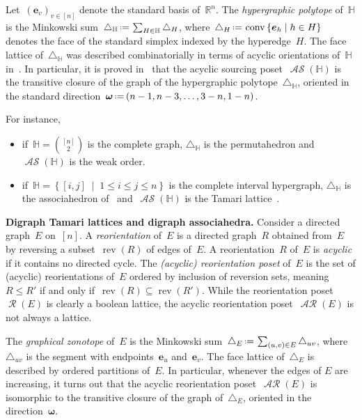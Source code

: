 \documentclass{amsart}
\theoremstyle{definition}
\newcommand{\R}{\mathbb{R}} %
\renewcommand{\b}[1]{\boldsymbol{#1}} %
\renewcommand{\c}[1]{\mathcal{#1}} %
\newcommand{\set}[2]{\left\{ #1 \;\middle|\; #2 \right\}} %
\newcommand{\eqdef}{\mbox{\,\raisebox{0.2ex}{\scriptsize\ensuremath{\mathrm:}}\ensuremath{=}\,}} %
\newcommand{\simplex}{\triangle} %
\DeclareMathOperator{\conv}{conv} %
\newcommand{\para}[1]{\bigskip\noindent\textbf{#1}} %
\newcommand{\darkblue}{\color{darkblue}} %
\newcommand{\defn}[1]{\textsl{\darkblue #1}} %
\DeclareMathOperator{\Reori}{\c{R}}  %
\DeclareMathOperator{\AReori}{\c{AR}}  %
\DeclareMathOperator{\rev}{rev} %
\DeclareMathOperator{\ASour}{\mathcal{AS}}  %
\newcommand{\HH}{\mathbb H}  %
\begin{document}
Let~$(\b{e}_v)_{v \in [n]}$ denote the standard basis of~$\R^n$.
The \defn{hypergraphic polytope} of~$\HH$ is the Minkowski sum~$\simplex_\HH \eqdef \sum_{H \in \HH} \simplex_H$, where~$\simplex_H \eqdef \conv\set{\b{e}_h}{h \in H}$ denotes the face of the standard simplex indexed by the hyperedge~$H$.
The face lattice of~$\simplex_\HH$ was described combinatorially in terms of acyclic orientations of~$\HH$ in~\cite{BenedettiBergeronMachacek}.
In particular, it is proved in~\cite{Gelinas} that the acyclic sourcing poset~$\ASour(\HH)$ is the transitive closure of the graph of the hypergraphic polytope~$\simplex_\HH$, oriented in the standard direction~$\b{\omega} \eqdef (n-1, n-3, \dots, 3-n, 1-n)$.

For instance, 
\begin{itemize}
\item if~$\HH = \binom{[n]}{2}$ is the complete graph, $\simplex_\HH$ is the permutahedron and $\ASour(\HH)$ is the weak order.
\item if~$\HH = \set{[i,j]}{1 \le i \le j \le n}$ is the complete interval hypergraph, $\simplex_\HH$ is the associahedron of~\cite{ShniderSternberg,Loday} and~$\ASour(\HH)$ is the Tamari lattice~\cite{Tamari}.
\end{itemize}


\para{Digraph Tamari lattices and digraph associahedra.}
Consider a directed graph~$E$ on~$[n]$.
A \defn{reorientation} of~$E$ is a directed graph~$R$ obtained from~$E$ by reversing a subset~$\rev(R)$ of edges of~$E$.
A reorientation~$R$ of~$E$ is \defn{acyclic} if it contains no directed cycle.
The \defn{(acyclic) reorientation poset} of~$E$ is the set of (acyclic) reorientations of~$E$ ordered by inclusion of reversion sets, meaning~$R \le R'$ if and only if~$\rev(R) \subseteq \rev(R')$.
While the reorientation poset~$\Reori(E)$ is clearly a boolean lattice, the acyclic reorientation poset~$\AReori(E)$ is not always a lattice.

The \defn{graphical zonotope} of~$E$ is the Minkowski sum~$\simplex_E \eqdef \sum_{(u,v) \in E} \simplex_{uv}$, where~$\simplex_{uv}$ is the segment with endpoints~$\b{e}_u$ and~$\b{e}_v$.
The face lattice of~$\simplex_E$ is described by ordered partitions of~$E$.
In particular, whenever the edges of $E$ are increasing, it turns out that the acyclic reorientation poset~$\AReori(E)$ is isomorphic to the transitive closure of the graph of~$\simplex_E$, oriented in the direction~$\b{\omega}$.
\end{document}
